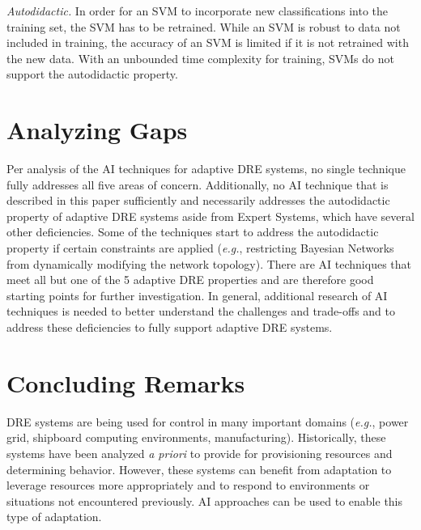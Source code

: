 \documentclass[conference]{IEEEtran}
\begin{document}
\emph{Autodidactic.} In order for an SVM to incorporate new classifications into the training set, the SVM has to be retrained. While an SVM is robust to data not included in training, the accuracy of an SVM is limited if it is not retrained with the new data. With an unbounded time complexity for training, SVMs do not support the autodidactic property.

\section{Analyzing Gaps}
\label{gap-analysis}
Per analysis of the AI techniques for adaptive DRE systems, no single technique fully addresses all five areas of concern. Additionally, no AI technique that is described in this paper sufficiently and necessarily addresses the autodidactic property of adaptive DRE systems aside from Expert Systems, which have several other deficiencies. Some of the techniques start to address the autodidactic property if certain constraints are applied (\emph{e.g.}, restricting Bayesian Networks from dynamically modifying the network topology).
There are AI techniques that meet all but one of the 5 adaptive DRE properties and are therefore good starting points for further investigation. In general, additional research of AI techniques is needed to better understand the challenges and trade-offs and to address these deficiencies to fully support adaptive DRE systems.


\section{Concluding Remarks}
\label{summary}
DRE systems are being used for control in many important domains (\emph{e.g.}, power grid, shipboard computing environments, manufacturing). Historically, these systems have been analyzed \emph{a priori} to provide for provisioning resources and determining behavior. However, these systems can benefit from adaptation to leverage resources more appropriately and to respond to environments or situations not encountered previously. AI approaches can be used to enable this type of adaptation.
\end{document}
